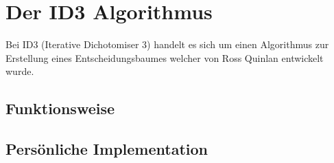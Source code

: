 \chapter{Der ID3 Algorithmus}
\label{id3}
Bei ID3 (Iterative Dichotomiser 3) handelt es sich um einen Algorithmus zur Erstellung eines Entscheidungsbaumes welcher von Ross Quinlan entwickelt wurde. \Autocite{QuinlanID3} 

\section{Funktionsweise}
\label{id3:funktionsweise}



\section{Persönliche Implementation}
\label{id3:implementation}